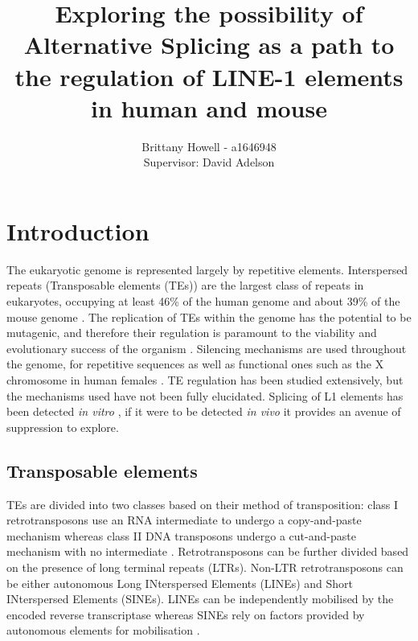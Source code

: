 \documentclass[12pt]{article}
\begin{document}
	
	\title{Exploring the possibility of Alternative Splicing as a path to the regulation of LINE-1 elements in human and mouse}
	\author{Brittany Howell - a1646948 \\ Supervisor: David Adelson}
	\date{}
	
	\maketitle
	
	
	\section{Introduction}
		
		The eukaryotic genome is represented largely by repetitive elements.
		Interspersed repeats (Transposable elements (TEs)) are the largest class of repeats in eukaryotes, occupying at least 46\% of the human genome \citep{Lander01} and about 39\% of the mouse genome \citep{Waterson02}.
		The replication of TEs within the genome has the potential to be mutagenic, and therefore their regulation is paramount to the viability and evolutionary success of the organism \citep{Bodak14}.
		Silencing mechanisms are used throughout the genome, for repetitive sequences as well as functional ones such as the X chromosome in human females \citep{EnLi14}. %
		TE regulation has been studied extensively, but the mechanisms used have not been fully elucidated.
		Splicing of L1 elements has been detected \textit{in vitro} \citep{Belancio06}, if it were to be detected \textit{in vivo} it provides an avenue of suppression to explore. 
			
		
		\subsection{Transposable elements}
			
			TEs are divided into two classes based on their method of transposition: class I retrotransposons use an RNA intermediate to undergo a copy-and-paste mechanism whereas class II DNA transposons undergo a cut-and-paste mechanism with no intermediate \citep{Feschotte07,Wicker07,Han10,Finnegan89}.
			Retrotransposons can be further divided based on the presence of long terminal repeats (LTRs).
			Non-LTR retrotransposons can be either autonomous Long INterspersed Elements (LINEs) and Short INterspersed Elements (SINEs).
			LINEs can be independently mobilised by the encoded reverse transcriptase whereas SINEs rely on factors provided by autonomous elements for mobilisation \citep{Jurka07}.
			
\end{document}

